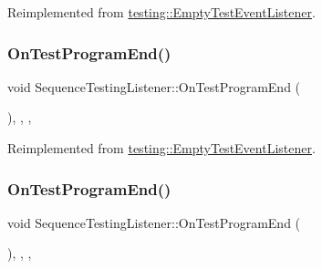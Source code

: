 Reimplemented from \mbox{\hyperlink{classtesting_1_1_empty_test_event_listener_a31edf103561e8b4d747656bc2d927661}{testing\+::\+Empty\+Test\+Event\+Listener}}.

\mbox{\label{class_sequence_testing_listener_a506077b57a6789daf900e61285a58d8a}} 
\subsubsection{\texorpdfstring{OnTestProgramEnd()}{OnTestProgramEnd()}\hspace{0.1cm}{\footnotesize\ttfamily [1/3]}}
{\footnotesize\ttfamily void Sequence\+Testing\+Listener\+::\+On\+Test\+Program\+End (\begin{DoxyParamCaption}\item[{const \mbox{\hyperlink{classtesting_1_1_unit_test}{Unit\+Test}} \&}]{ }\end{DoxyParamCaption})\hspace{0.3cm}{\ttfamily [inline]}, {\ttfamily [override]}, {\ttfamily [protected]}, {\ttfamily [virtual]}}



Reimplemented from \mbox{\hyperlink{classtesting_1_1_empty_test_event_listener_aaa9d683e8e0c850af67a0b92d785ddb9}{testing\+::\+Empty\+Test\+Event\+Listener}}.

\mbox{\label{class_sequence_testing_listener_a506077b57a6789daf900e61285a58d8a}} 
\subsubsection{\texorpdfstring{OnTestProgramEnd()}{OnTestProgramEnd()}\hspace{0.1cm}{\footnotesize\ttfamily [2/3]}}
{\footnotesize\ttfamily void Sequence\+Testing\+Listener\+::\+On\+Test\+Program\+End (\begin{DoxyParamCaption}\item[{const \mbox{\hyperlink{classtesting_1_1_unit_test}{Unit\+Test}} \&}]{ }\end{DoxyParamCaption})\hspace{0.3cm}{\ttfamily [inline]}, {\ttfamily [override]}, {\ttfamily [protected]}, {\ttfamily [virtual]}}



